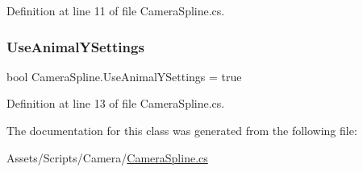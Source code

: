 Definition at line 11 of file Camera\+Spline.\+cs.

\mbox{\label{class_camera_spline_a2d886ed83b154eba17d8d3f7900af697}} 
\subsubsection{\texorpdfstring{Use\+Animal\+Y\+Settings}{UseAnimalYSettings}}
{\footnotesize\ttfamily bool Camera\+Spline.\+Use\+Animal\+Y\+Settings = true}



Definition at line 13 of file Camera\+Spline.\+cs.



The documentation for this class was generated from the following file\+:\begin{DoxyCompactItemize}
\item 
Assets/\+Scripts/\+Camera/\mbox{\hyperlink{_camera_spline_8cs}{Camera\+Spline.\+cs}}\end{DoxyCompactItemize}

